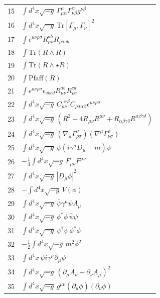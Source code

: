 \documentclass[12pt,a4paper]{article}
\begin{document}
\begin{longtable}{r p{}}
		15 & \(\displaystyle \int d^4x\sqrt{-g}\,\Gamma^{\mu}_{\mu\alpha}\Gamma^{\alpha}_{\nu\beta}g^{\nu\beta}\) \\
		16 & \(\displaystyle \int d^4x\sqrt{-g}\,\mathrm{Tr}[\Gamma_\mu,\Gamma_\nu]^2\) \\
		17 & \(\displaystyle \int \epsilon^{\mu\nu\rho\sigma}R_{\mu\nu}^{ab}R_{\rho\sigma ab}\) \\
		18 & \(\displaystyle \int \mathrm{Tr}(R\wedge R)\) \\
		19 & \(\displaystyle \int \mathrm{Tr}(R\wedge\star R)\) \\
		20 & \(\displaystyle \int \mathrm{Pfaff}(R)\) \\
		21 & \(\displaystyle \int \epsilon^{\mu\nu\rho\sigma}\epsilon_{abcd}R_{\mu\nu}^{ab}R_{\rho\sigma}^{cd}\) \\
		22 & \(\displaystyle \int d^4x\sqrt{-g}\,C_{\mu\nu}^{\ \ \alpha\beta}C_{\rho\sigma\alpha\beta}\epsilon^{\mu\nu\rho\sigma}\) \\
		23 & \(\displaystyle \int d^4x\sqrt{-g}\,(R^2 - 4R_{\mu\nu}R^{\mu\nu} + R_{\alpha\beta\gamma\delta}R^{\alpha\beta\gamma\delta})\) \\
		24 & \(\displaystyle \int d^4x\sqrt{-g}\,(\nabla_\mu\Gamma^{\nu}_{\rho\sigma})(\nabla^\mu\Gamma^{\rho}_{\nu\sigma})\) \\
		25 & \(\displaystyle \int d^4x\sqrt{-g}\,\bar\psi(i\gamma^\mu D_\mu - m)\psi\) \\
		26 & \(\displaystyle -\frac14\int d^4x\sqrt{-g}\,F_{\mu\nu}F^{\mu\nu}\) \\
		27 & \(\displaystyle \int d^4x\sqrt{-g}\,|D_\mu\phi|^2\) \\
		28 & \(\displaystyle -\int d^4x\sqrt{-g}\,V(\phi)\) \\
		29 & \(\displaystyle \int d^4x\sqrt{-g}\,\bar\psi\gamma^\mu\psi A_\mu\) \\
		30 & \(\displaystyle \int d^4x\sqrt{-g}\,\phi^*\phi\,\bar\psi\psi\) \\
		31 & \(\displaystyle \int d^4x\sqrt{-g}\,\psi^\dagger\psi\,\phi^*\phi\) \\
		32 & \(\displaystyle -\frac12\int d^4x\sqrt{-g}\,m^2\phi^2\) \\
		33 & \(\displaystyle \int d^4x\,\bar\psi i\gamma^\mu\partial_\mu\psi\) \\
		34 & \(\displaystyle \int d^4x\sqrt{-g}\,(\partial_\mu A_\nu - \partial_\nu A_\mu)^2\) \\
		35 & \(\displaystyle \int d^4x\sqrt{-g}\,g^{\mu\nu}(\partial_\mu\phi)(\partial_\nu\phi)\) \\

\end{longtable}
\end{document}
